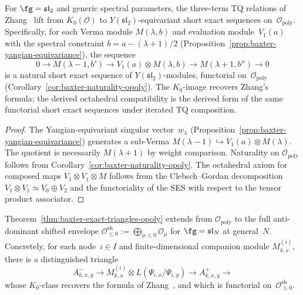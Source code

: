 \begin{theorem}
\label{thm:baxter-exact-triangles-opoly}
For $\fg = \mathfrak{sl}_2$ and generic spectral parameters,
the three-term TQ relations of Zhang~\cite{Zhang24} lift from
$K_0(\mathcal{O})$ to
$Y(\mathfrak{sl}_2)$-equivariant short exact sequences
on~$\mathcal{O}_{\mathrm{poly}}$.
Specifically, for each Verma module $M(\lambda, b)$ and
evaluation module~$V_1(a)$ with the spectral constraint
$b = a - (\lambda + 1)/2$
\textup{(}Proposition~\textup{\ref{prop:baxter-yangian-equivariance})},
the sequence
\[
0 \to M(\lambda - 1, b') \to V_1(a) \otimes M(\lambda, b)
 \to M(\lambda + 1, b'') \to 0
\]
is a natural short exact sequence of $Y(\mathfrak{sl}_2)$-modules,
functorial on~$\mathcal{O}_{\mathrm{poly}}$
\textup{(}Corollary~\textup{\ref{cor:baxter-naturality-opoly})}.
The $K_0$-image recovers Zhang's formula; the derived
octahedral compatibility is the derived form of the same functorial
short exact sequences under iterated TQ composition.
\end{theorem}

\begin{proof}
The Yangian-equivariant singular vector~$w_\lambda$
(Proposition~\ref{prop:baxter-yangian-equivariance}) generates
a sub-Verma $M(\lambda - 1) \hookrightarrow V_1(a) \otimes M(\lambda)$.
The quotient is necessarily $M(\lambda + 1)$ by weight comparison.
Naturality on $\mathcal{O}_{\mathrm{poly}}$ follows from
Corollary~\ref{cor:baxter-naturality-opoly}.
The octahedral axiom for composed maps $V_1 \otimes V_1 \otimes M$
follows from the Clebsch--Gordan decomposition
$V_1 \otimes V_1 \simeq V_0 \oplus V_2$ and the functoriality of
the SES with respect to the tensor product associator.
\end{proof}

\begin{theorem}
\label{thm:baxter-exact-triangles}
Theorem~\textup{\ref{thm:baxter-exact-triangles-opoly}} extends
from $\mathcal{O}_{\mathrm{poly}}$ to the full anti-dominant
shifted envelope
$\mathcal{O}^{\mathrm{sh}}_{\leq 0}
:= \bigoplus_{\mu \leq 0} \mathcal{O}_\mu$
for $\fg = \mathfrak{sl}_N$ at general~$N$.
Concretely, for each node~$i \in I$ and finite-dimensional companion
module $M_{k,x}^{(i)}$, there is a distinguished triangle
\[
A^-_{k,x,y} \to M_{k,x}^{(i)} \otimes L(\Psi_{i,x}/\Psi_{i,y})
\to A^+_{k,x,y} \to
\]
whose $K_0$-class recovers the formula of Zhang~\cite{Zhang24},
and which is functorial on~$\mathcal{O}^{\mathrm{sh}}_{\leq 0}$.
\end{theorem}

